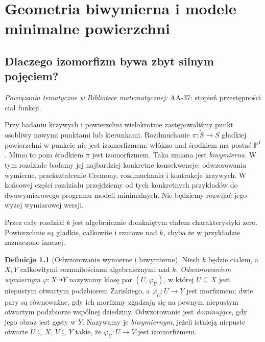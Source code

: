 \documentclass[11pt,a4paper,openany]{report}
\numberwithin{equation}{section}
\theoremstyle{plain}
\theoremstyle{definition}
\newtheorem{definicja}[twierdzenie]{Definicja}
\theoremstyle{remark}
\newcommand{\PP}{\mathbb P}
\begin{document}

\chapter{Geometria biwymierna i modele minimalne powierzchni}
\label{ch:ga8-biwymierna}

\providecommand{\atlasref}[2]{#2}


\section{Dlaczego izomorfizm bywa zbyt silnym pojęciem?}
\label{sec:ga8-motivation}

\noindent\emph{Powiązania tematyczne w Bibliotece matematycznej:} \atlasref{AA-37::aa:tw:transcendence-degree}{AA-37: stopień przestępności ciał funkcji}.


Przy badaniu krzywych i powierzchni wielokrotnie zastępowaliśmy
punkt osobliwy nowymi punktami lub kierunkami. Rozdmuchanie
$\pi:\widetilde S\to S$ gładkiej powierzchni w punkcie
nie jest izomorfizmem: włókno nad środkiem ma postać $\PP^1$.
Mimo to poza środkiem $\pi$ jest izomorfizmem. Taka zmiana
jest \emph{biwymierna}. W tym rozdziale badamy jej najbardziej
konkretne konsekwencje: odwzorowania wymierne, przekształcenie
Cremony, rozdmuchania i kontrakcje krzywych.
W końcowej części rozdziału przejdziemy od tych
konkretnych przykładów do dwuwymiarowego programu
modeli minimalnych. Nie będziemy rozwijać jego
wyżej wymiarowej wersji.

Przez cały rozdział $k$ jest algebraicznie domkniętym ciałem
charakterystyki zero. Powierzchnie są gładkie, całkowite i
rzutowe nad $k$, chyba że w przykładzie zaznaczono inaczej.

\begin{definicja}[Odwzorowanie wymierne i biwymierne]
\label{def:ga8-rational}
Niech $k$ będzie ciałem, a $X,Y$ całkowitymi rozmaitościami
algebraicznymi nad $k$. \emph{Odwzorowaniem wymiernym} $\varphi:X\dashrightarrow Y$
nazywamy klasę par $(U,\varphi_U)$, w której $U\subseteq X$
jest niepustym otwartym podzbiorem Zariskiego, a
$\varphi_U:U\to Y$ jest morfizmem; dwie pary są równoważne,
gdy ich morfizmy zgadzają się na pewnym niepustym
otwartym podzbiorze wspólnej dziedziny. Odwzorowanie jest
\emph{dominujące}, gdy jego obraz jest gęsty w $Y$.
Nazywamy je \emph{biwymiernym}, jeżeli istnieją niepuste
otwarte $U\subseteq X$, $V\subseteq Y$ takie, że
$\varphi_U:U\to V$ jest izomorfizmem.
\end{definicja}
\end{document}
